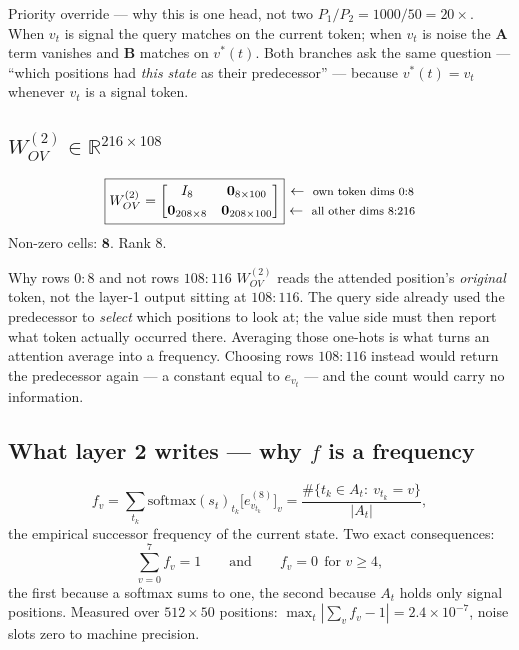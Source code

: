 \documentclass[11pt]{article}
\newcommand{\R}{\mathbb{R}}
\newcommand{\Wov}{W_{OV}}
\newcommand{\rowlab}[1]{\ \leftarrow\ \text{\footnotesize #1}}
\begin{document}
\begin{warningbox}{Priority override --- why this is one head, not two}
$P_1/P_2=1000/50=20\times$. When $v_t$ is signal the query matches on the current token; when
$v_t$ is noise the $\bm{A}$ term vanishes and $\bm{B}$ matches on $v^*(t)$. Both branches ask the
same question --- ``which positions had \emph{this state} as their predecessor'' --- because
$v^*(t)=v_t$ whenever $v_t$ is a signal token.
\end{warningbox}

\subsection{$\Wov^{(2)}\in\R^{216\times108}$}
\begin{equation}
\boxed{\Wov^{(2)}=
\begin{bmatrix}
I_8 & \bm{0}_{8\times100}\\[2pt]
\bm{0}_{208\times8} & \bm{0}_{208\times100}
\end{bmatrix}}
\begin{matrix}
\rowlab{own token dims $0{:}8$}\\[2pt]
\rowlab{all other dims $8{:}216$}
\end{matrix}
\end{equation}
Non-zero cells: $\bm{8}$. Rank $8$.

\begin{notebox}{Why rows $0{:}8$ and not rows $108{:}116$}
$\Wov^{(2)}$ reads the attended position's \emph{original} token, not the layer-1 output sitting
at $108{:}116$. The query side already used the predecessor to \emph{select} which positions to
look at; the value side must then report what token actually occurred there. Averaging those
one-hots is what turns an attention average into a frequency. Choosing rows $108{:}116$ instead
would return the predecessor again --- a constant equal to $e_{v_t}$ --- and the count would carry
no information.
\end{notebox}

\subsection{What layer 2 writes --- why $f$ is a frequency}
\begin{equation}
f_v=\sum_{t_k}\mathrm{softmax}(s_t)_{t_k}\bigl[e^{(8)}_{v_{t_k}}\bigr]_v
=\frac{\#\{t_k\in A_t:\ v_{t_k}=v\}}{|A_t|},
\end{equation}
the empirical successor frequency of the current state. Two exact consequences:
\begin{equation}
\boxed{\textstyle\sum_{v=0}^{7}f_v=1}\qquad\text{and}\qquad
\boxed{f_v=0\ \ \text{for }v\ge4},
\end{equation}
the first because a softmax sums to one, the second because $A_t$ holds only signal positions.
Measured over $512\times50$ positions: $\max_t|\sum_v f_v-1|=2.4\times10^{-7}$, noise slots zero
to machine precision.
\end{document}
